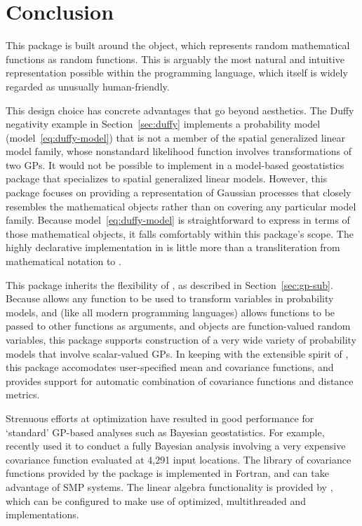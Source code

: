\documentclass[article]{jss}
\begin{document}
\section{Conclusion}

This package is built around the  object, which represents random mathematical functions as random  functions. This is arguably the most natural and intuitive representation possible within the  programming language, which itself is widely regarded as unusually human-friendly. 

This design choice has concrete advantages that go beyond aesthetics. The Duffy negativity example in Section~\ref{sec:duffy} implements a probability model (model~\ref{eq:duffy-model}) that is not a member of the spatial generalized linear model family, whose nonstandard likelihood function involves transformations of two GPs. It would not be possible to implement in a model-based geostatistics package that specializes to spatial generalized linear models. However, this package focuses on providing a  representation of Gaussian processes that closely resembles the mathematical objects rather than on covering any particular model family. Because model~\ref{eq:duffy-model} is straightforward to express in terms of those mathematical objects, it falls comfortably within this package's scope. The highly declarative implementation in  is little more than a transliteration from mathematical notation to . 

This package inherits the flexibility of , as described in Section~\ref{sec:gp-sub}. Because  allows any  function to be used to transform variables in probability models, and  (like all modern programming languages) allows functions to be passed to other functions as arguments, and  objects are function-valued random variables, this package supports construction of a very wide variety of probability models that involve scalar-valued GPs. In keeping with the extensible spirit of , this package accomodates user-specified mean and covariance functions, and provides support for automatic combination of covariance functions and distance metrics.

Strenuous efforts at optimization have resulted in good performance for `standard' GP-based analyses such as Bayesian geostatistics. For example, \cite{map} recently used it to conduct a fully Bayesian analysis involving a very expensive covariance function evaluated at 4,291 input locations. The library of covariance functions provided by the package is implemented in Fortran, and can take advantage of SMP systems. The linear algebra functionality is provided by , which can be configured to make use of optimized, multithreaded  \citep{blas} and  \citep{lapack}  implementations. 
\end{document}
